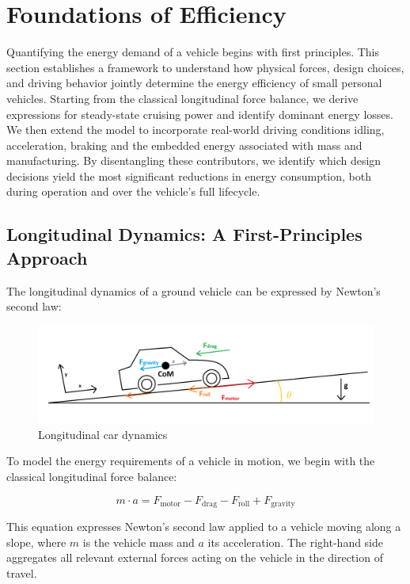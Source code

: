 \section{Foundations of Efficiency}
Quantifying the energy demand of a vehicle begins with first principles. This section establishes a framework to understand how physical forces, design choices, and driving behavior jointly determine the energy efficiency of small personal vehicles. Starting from the classical longitudinal force balance, we derive expressions for steady-state cruising power and identify dominant energy losses. We then extend the model to incorporate real-world driving conditions idling, acceleration, braking and the embedded energy associated with mass and manufacturing. By disentangling these contributors, we identify which design decisions yield the most significant reductions in energy consumption, both during operation and over the vehicle’s full lifecycle.

\subsection{Longitudinal Dynamics: A First-Principles Approach}
The longitudinal dynamics of a ground vehicle can be expressed by Newton’s second law:

\begin{figure}[h!]
    \centering
    \includegraphics[width=1\linewidth]{Figures/ch1_ForceAxis.png}
    \caption{Longitudinal car dynamics}
    \label{fig:longcardynamics}
\end{figure}

To model the energy requirements of a vehicle in motion, we begin with the classical longitudinal force balance:

\[
m \cdot a = F_{\text{motor}} - F_{\text{drag}} - F_{\text{roll}} + F_{\text{gravity}}
\]

This equation expresses Newton’s second law applied to a vehicle moving along a slope, where \( m \) is the vehicle mass and \( a \) its acceleration. The right-hand side aggregates all relevant external forces acting on the vehicle in the direction of travel.

